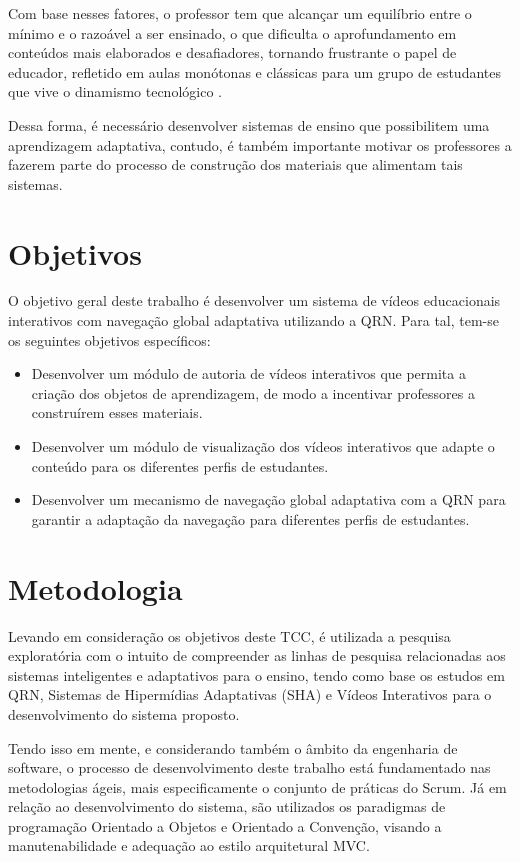 Com base nesses fatores, o professor tem que alcançar um equilíbrio entre o mínimo e o razoável a ser ensinado, o que dificulta o aprofundamento em conteúdos mais elaborados e desafiadores, tornando frustrante o papel de educador, refletido em aulas monótonas e clássicas para um grupo de estudantes que vive o dinamismo tecnológico \cite{fragelli2010}.

Dessa forma, é necessário desenvolver sistemas de ensino que possibilitem uma aprendizagem adaptativa, contudo, é também importante motivar os professores a fazerem parte do processo de construção dos materiais que alimentam tais sistemas.

\section[Objetivos]{Objetivos}

O objetivo geral deste trabalho é desenvolver um sistema de vídeos educacionais interativos com navegação global adaptativa utilizando a QRN. Para tal, tem-se os seguintes objetivos específicos:
\begin{itemize}
  	\item Desenvolver um módulo de autoria de vídeos interativos que permita a criação dos objetos de aprendizagem, de modo a incentivar professores a construírem esses materiais.
  	\item Desenvolver um módulo de visualização dos vídeos interativos que adapte o conteúdo para os diferentes perfis de estudantes.
  	\item Desenvolver um mecanismo de navegação global adaptativa com a QRN para garantir a adaptação da navegação para diferentes perfis de estudantes.
\end{itemize}

\section[Metodologia]{Metodologia}
Levando em consideração os objetivos deste TCC, é utilizada a pesquisa exploratória com o intuito de compreender as linhas de pesquisa relacionadas aos sistemas inteligentes e adaptativos para o ensino, tendo como base os estudos em QRN, Sistemas de Hipermídias Adaptativas (SHA) e Vídeos Interativos para o desenvolvimento do sistema proposto.

Tendo isso em mente, e considerando também o âmbito da engenharia de software, o processo de desenvolvimento deste trabalho está fundamentado nas metodologias ágeis, mais especificamente o conjunto de práticas do Scrum. Já em relação ao desenvolvimento do sistema, são utilizados os paradigmas de programação Orientado a Objetos e Orientado a Convenção, visando a manutenabilidade e adequação ao estilo arquitetural MVC.

